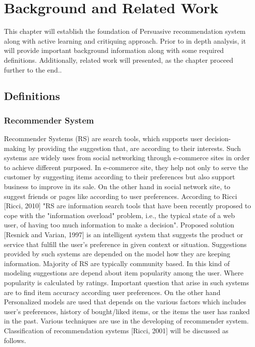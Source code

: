 
\chapter{Background and Related Work}

This chapter will establish the foundation of Persuasive recommendation system along with active learning and critiquing approach. Prior to in depth analysis, it will provide important background information along with some required definitions. Additionally, related work will presented, as the chapter proceed further to the end..\newline

\section{Definitions}

\subsection{Recommender System}

Recommender Systems (RS) are search tools, which supports user decision-making by providing the suggestion that, are according to their interests. Such systems are widely uses from social networking through e-commerce sites in order to achieve different purposed. In e-commerce site, they help not only to serve the customer by suggesting items according to their preferences but also support business to improve in its sale. On the other hand in social network site, to suggest friends or pages like according to user preferences. According to Ricci [Ricci, 2010] "RS are information search tools that have been recently proposed to cope with the "information overload" problem, i.e., the typical state of a web user, of having too much information to make a decision". Proposed solution [Resnick and Varian, 1997] is an intelligent system that suggests the product or service that fulfill the user’s preference in given context or situation. Suggestions provided by such systems are depended on the model how they are keeping information. Majority of RS are typically community based. In this kind of modeling suggestions are depend about item popularity among the user. Where popularity is calculated by ratings. Important question that arise in such systems are to find item accuracy according user preferences. On the other hand Personalized models are used that depends on the various factors which includes user’s preferences, history of bought/liked items, or the items the user has ranked in the past. Various techniques are use in the developing of recommender system. Classification of recommendation systems [Ricci, 2001] will be discussed as follows.

